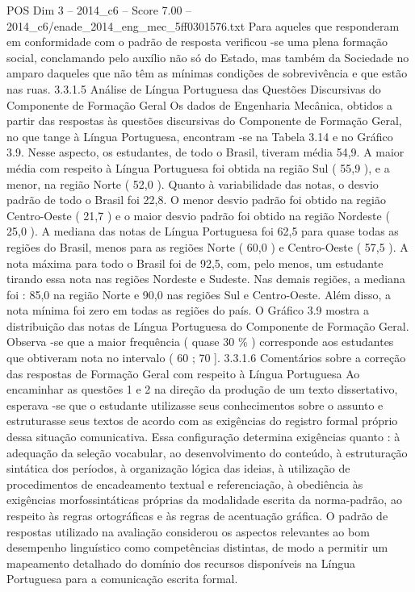 \begin{textsample}{POS Dim 3 – 2014\_c6 – Score 7.00 – 2014\_c6/enade\_2014\_eng\_mec\_5ff0301576.txt}
Para aqueles que responderam em conformidade com o padrão de resposta verificou -se uma plena formação social, conclamando pelo auxílio não só do Estado, mas também da Sociedade no amparo daqueles que não têm as mínimas condições de sobrevivência e que estão nas ruas. 3.3.1.5 Análise de Língua Portuguesa das Questões Discursivas do Componente de Formação Geral Os dados de Engenharia Mecânica, obtidos a partir das respostas às questões discursivas do Componente de Formação Geral, no que tange à Língua Portuguesa, encontram -se na Tabela 3.14 e no Gráfico 3.9.
Nesse aspecto, os estudantes, de todo o Brasil, tiveram média 54,9.
A maior média com respeito à Língua Portuguesa foi obtida na região Sul ( 55,9 ), e a menor, na região Norte ( 52,0 ).
Quanto à variabilidade das notas, o desvio padrão de todo o Brasil foi 22,8.
O menor desvio padrão foi obtido na região Centro-Oeste ( 21,7 ) e o maior desvio padrão foi obtido na região Nordeste ( 25,0 ).
A mediana das notas de Língua Portuguesa foi 62,5 para quase todas as regiões do Brasil, menos para as regiões Norte ( 60,0 ) e Centro-Oeste ( 57,5 ).
A nota máxima para todo o Brasil foi de 92,5, com, pelo menos, um estudante tirando essa nota nas regiões Nordeste e Sudeste.
Nas demais regiões, a mediana foi : 85,0 na região Norte e 90,0 nas regiões Sul e Centro-Oeste.
Além disso, a nota mínima foi zero em todas as regiões do país.
O Gráfico 3.9 mostra a distribuição das notas de Língua Portuguesa do Componente de Formação Geral.
Observa -se que a maior frequência ( quase 30 \% ) corresponde aos estudantes que obtiveram nota no intervalo ( 60 ; 70 ]. 3.3.1.6 Comentários sobre a correção das respostas de Formação Geral com respeito à Língua Portuguesa Ao encaminhar as questões 1 e 2 na direção da produção de um texto dissertativo, esperava -se que o estudante utilizasse seus conhecimentos sobre o assunto e estruturasse seus textos de acordo com as exigências do registro formal próprio dessa situação comunicativa.
Essa configuração determina exigências quanto : à adequação da seleção vocabular, ao desenvolvimento do conteúdo, à estruturação sintática dos períodos, à organização lógica das ideias, à utilização de procedimentos de encadeamento textual e referenciação, à obediência às exigências morfossintáticas próprias da modalidade escrita da norma-padrão, ao respeito às regras ortográficas e às regras de acentuação gráfica.
O padrão de respostas utilizado na avaliação considerou os aspectos relevantes ao bom desempenho linguístico como competências distintas, de modo a permitir um mapeamento detalhado do domínio dos recursos disponíveis na Língua Portuguesa para a comunicação escrita formal.

\end{textsample}
